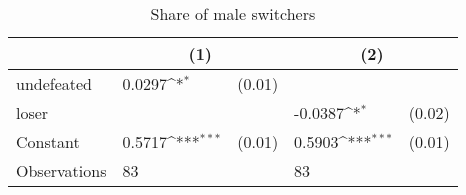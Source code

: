\begin{table}[htbp]\centering
\def\sym#1{\ifmmode^{#1}\else\(^{#1}\)\fi}
\caption{Share of male switchers}
\begin{tabular*}{.7\hsize}{@{\hskip\tabcolsep\extracolsep\fill}l*{2}{lc}}
\toprule
                &\multicolumn{2}{c}{(1)}     &\multicolumn{2}{c}{(2)}     \\
\midrule
undefeated      &   0.0297\sym{*}  &   (0.01)&                  &         \\
loser           &                  &         &  -0.0387\sym{*}  &   (0.02)\\
Constant        &   0.5717\sym{***}&   (0.01)&   0.5903\sym{***}&   (0.01)\\
\midrule
Observations    &       83         &         &       83         &         \\
\bottomrule
\end{tabular*}
\end{table}
